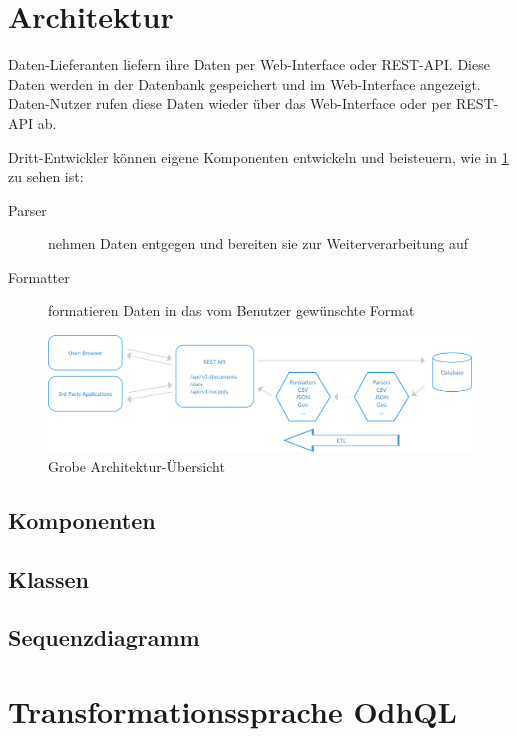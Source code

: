 \section{Architektur}

Daten-Lieferanten liefern ihre Daten per Web-Interface oder REST-API. Diese Daten werden in der Datenbank gespeichert und im Web-Interface angezeigt. Daten-Nutzer rufen diese Daten wieder über das Web-Interface oder per REST-API ab. 

Dritt-Entwickler können eigene Komponenten entwickeln und beisteuern, wie in \cref{fig:pd:arch-overview} zu sehen ist:
\begin{description}
\item[Parser] nehmen Daten entgegen und bereiten sie zur Weiterverarbeitung auf
\item[Formatter] formatieren Daten in das vom Benutzer gewünschte Format
\end{description}

\begin{figure}[H]
    \centering
    \includegraphics[width=\linewidth]{fig/ODH-Architecture-Overview}
    \caption{Grobe Architektur-Übersicht}
    \label{fig:pd:arch-overview}
\end{figure}

\subsection{Komponenten}


\subsection{Klassen}


\subsection{Sequenzdiagramm}


\section{Transformationssprache OdhQL}

